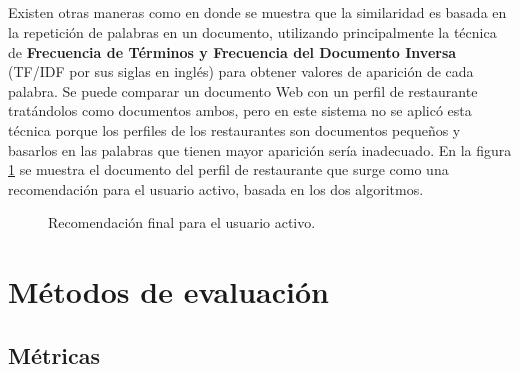 \documentclass[12pt,letterpaper,oneside] {memoir}
\begin{document}
\paragraph{}
Existen otras maneras como en \citep{Cristian2010} donde se muestra que la similaridad es basada en la repetición de palabras en un documento, utilizando principalmente la técnica de \textbf{Frecuencia de Términos y Frecuencia del Documento Inversa} (TF/IDF por sus siglas en inglés) \citep{Adomavicius2005} para obtener valores de aparición de cada palabra.  
Se puede comparar un documento Web con un perfil de restaurante tratándolos como documentos ambos,  pero en este sistema no se aplicó esta técnica porque los perfiles de los restaurantes son documentos pequeños y basarlos en las palabras que tienen mayor aparición sería inadecuado. En la figura \ref{fig:p8} se muestra el documento del perfil de restaurante que surge como una recomendación para el usuario activo, basada en los dos algoritmos.\\

\begin{figure}[H]
\centering 
{} \caption{Recomendación final para el usuario activo.} 
\label{fig:p8} 
\end{figure}


\chapter[Métodos de evaluación]{Métodos de evaluación}

\section{Métricas}
\end{document}
